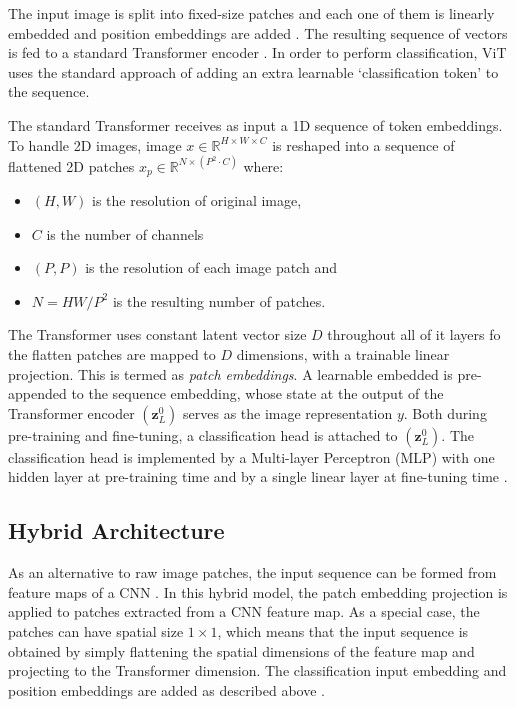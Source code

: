 \documentclass[12pt, a4paper]{report}
\begin{document}
The input image is split into fixed-size patches and each one of them is linearly embedded and position embeddings are added \cite{wiki:word2vec}. The resulting sequence of vectors is fed to a standard Transformer encoder \cite{2017arXiv170603762V}. In order to perform classification, ViT uses the standard approach of adding an extra learnable `classification token' to the sequence.

The standard Transformer receives as input a 1D sequence of token embeddings. To handle 2D images, image $x \in \mathbb{R}^{H\times W\times C}$ is reshaped into a sequence of flattened 2D patches $x_p \in \mathbb{R}^{N\times (P^2 \cdot C)}$ where:

\begin{itemize}
    \item $(H, W)$ is the resolution of original image,
    \item $C$ is the number of channels
    \item $(P, P)$ is the resolution of each image patch and
    \item $N = HW/P^2$ is the resulting number of patches.
\end{itemize}

The Transformer uses constant latent vector size $D$ throughout all of it layers fo the flatten patches are mapped to $D$ dimensions, with a trainable linear projection. This is termed as \emph{patch embeddings}. A learnable embedded is pre-appended to the sequence embedding, whose state at the output of the Transformer encoder $(\textbf{z}_L^0)$ serves as the image representation $y$. Both during pre-training and fine-tuning, a classification head is attached to $(\textbf{z}_L^0)$. The classification head is implemented by a Multi-layer Perceptron (MLP) with one hidden layer at pre-training time and by a single linear layer at fine-tuning time \cite{2020arXiv201011929D}.

\subsection{Hybrid Architecture}
\label{subsec:hybrdarch}

\hspace{0.5cm} As an alternative to raw image patches, the input sequence can be formed from feature maps of a CNN \cite{art:ieee:backprophzcr}. In this hybrid model, the patch embedding projection is applied to patches extracted from a CNN feature map. As a special case, the patches can have spatial size $1\times 1$, which means that the input sequence is obtained by simply flattening the spatial dimensions of the feature map and projecting to the Transformer dimension. The classification input embedding and position embeddings are added as described above \cite{2020arXiv201011929D}.
\end{document}

